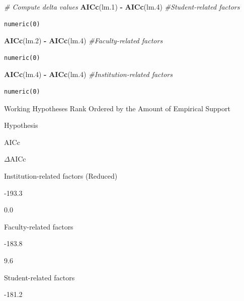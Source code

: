 \documentclass[]{book}
\newenvironment{Shaded}{\begin{snugshade}}{\end{snugshade}}
\newcommand{\CommentTok}[1]{\textcolor[rgb]{0.56,0.35,0.01}{\textit{#1}}}
\newcommand{\FloatTok}[1]{\textcolor[rgb]{0.00,0.00,0.81}{#1}}
\newcommand{\KeywordTok}[1]{\textcolor[rgb]{0.13,0.29,0.53}{\textbf{#1}}}
\newcommand{\NormalTok}[1]{#1}
\newcommand{\OperatorTok}[1]{\textcolor[rgb]{0.81,0.36,0.00}{\textbf{#1}}}
\newcommand{\StringTok}[1]{\textcolor[rgb]{0.31,0.60,0.02}{#1}}
\begin{document}
\begin{Shaded}
\begin{Highlighting}[]
\CommentTok{# Compute delta values}
\KeywordTok{AICc}\NormalTok{(lm}\FloatTok{.1}\NormalTok{) }\OperatorTok{-}\StringTok{ }\KeywordTok{AICc}\NormalTok{(lm}\FloatTok{.4}\NormalTok{) }\CommentTok{#Student-related factors}
\end{Highlighting}
\end{Shaded}

\begin{verbatim}
numeric(0)
\end{verbatim}

\begin{Shaded}
\begin{Highlighting}[]
\KeywordTok{AICc}\NormalTok{(lm}\FloatTok{.2}\NormalTok{) }\OperatorTok{-}\StringTok{ }\KeywordTok{AICc}\NormalTok{(lm}\FloatTok{.4}\NormalTok{) }\CommentTok{#Faculty-related factors}
\end{Highlighting}
\end{Shaded}

\begin{verbatim}
numeric(0)
\end{verbatim}

\begin{Shaded}
\begin{Highlighting}[]
\KeywordTok{AICc}\NormalTok{(lm}\FloatTok{.4}\NormalTok{) }\OperatorTok{-}\StringTok{ }\KeywordTok{AICc}\NormalTok{(lm}\FloatTok{.4}\NormalTok{) }\CommentTok{#Institution-related factors}
\end{Highlighting}
\end{Shaded}

\begin{verbatim}
numeric(0)
\end{verbatim}

\label{tab:unnamed-chunk-184}Working Hypotheses Rank Ordered by the Amount of Empirical Support

Hypothesis

AICc

\(\Delta\)AICc

Institution-related factors (Reduced)

-193.3

0.0

Faculty-related factors

-183.8

9.6

Student-related factors

-181.2
\end{document}

